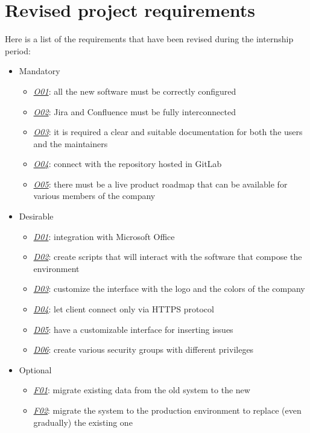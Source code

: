 \newpage
\section{Revised project requirements}
	Here is a list of the requirements that have been revised during the internship period:
	\begin{itemize}
		\item Mandatory
		\begin{itemize}
			\item \underline{\textit{O01}}: all the new software must be correctly configured
			\item \underline{\textit{O02}}: Jira and Confluence must be fully interconnected
			\item \underline{\textit{O03}}: it is required a clear and suitable documentation for both the users and the maintainers
			\item \underline{\textit{O04}}: connect with the repository hosted in GitLab
			\item \underline{\textit{O05}}: there must be a live product roadmap that can be available for various members of the company
		\end{itemize}
		\item Desirable
		\begin{itemize}
			\item \underline{\textit{D01}}: integration with Microsoft Office
			\item \underline{\textit{D02}}: create scripts that will interact with the software that compose the environment
			\item \underline{\textit{D03}}: customize the interface with the logo and the colors of the company
			\item \underline{\textit{D04}}: let client connect only via HTTPS protocol
			\item \underline{\textit{D05}}: have a customizable interface for inserting issues
			\item \underline{\textit{D06}}: create various security groups with different privileges
		\end{itemize}
		\item Optional
		\begin{itemize}
			\item \underline{\textit{F01}}: migrate existing data from the old system to the new
			\item \underline{\textit{F02}}: migrate the system to the production environment to replace (even gradually) the existing one
		\end{itemize} 
	\end{itemize}